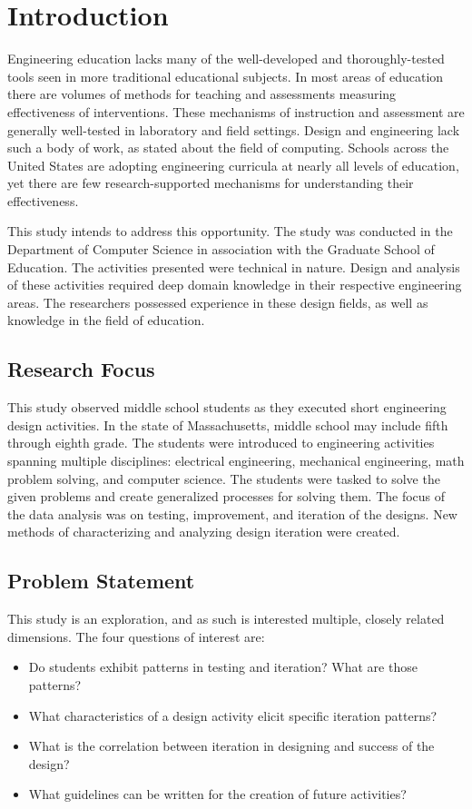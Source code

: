\chapter{Introduction}

Engineering education lacks many of the well-developed and thoroughly-tested tools seen in more traditional educational subjects. In most areas of education there are volumes of methods for teaching and assessments measuring effectiveness of interventions. These mechanisms of instruction and assessment are generally well-tested in laboratory and field settings. Design and engineering lack such a body of work, as \citet[p. 35]{csed-guzdial} stated about the field of computing. Schools across the United States are adopting engineering curricula at nearly all levels of education, yet there are few research-supported mechanisms for understanding their effectiveness.

This study  intends to address this opportunity. The study was conducted in the Department of Computer Science in association with the Graduate School of Education. The activities presented were technical in nature. Design and analysis of these activities required deep domain knowledge in their respective engineering areas. The researchers possessed experience in these design fields, as well as knowledge in the field of education.

\section{Research Focus}
This study observed middle school students as they executed short engineering design activities. In the state of Massachusetts, middle school may include fifth through eighth grade. The students were introduced to engineering activities spanning multiple disciplines: electrical engineering, mechanical engineering, math problem solving, and computer science. The students were tasked to solve the given problems and create generalized processes for solving them. The focus of the data analysis was on testing, improvement, and iteration of the designs. New methods of characterizing and analyzing design iteration were created.
 
\section{Problem Statement}
This study is an exploration, and as such is interested multiple, closely related dimensions. The four questions of interest are:
\begin{itemize}
\item Do students exhibit patterns in testing and iteration? What are those patterns?
\item What characteristics of a design activity elicit specific iteration patterns?
\item What is the correlation between iteration in designing and success of the design?
\item What guidelines can be written for the creation of future activities?
\end{itemize}


